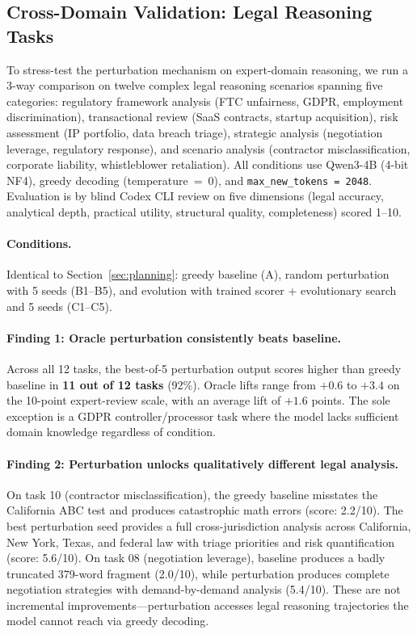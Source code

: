 \documentclass{article}
\begin{document}
\subsection{Cross-Domain Validation: Legal Reasoning Tasks}
\label{sec:legal}

To stress-test the perturbation mechanism on expert-domain reasoning, we
run a 3-way comparison on twelve complex legal reasoning scenarios spanning
five categories: regulatory framework analysis (FTC unfairness, GDPR, employment
discrimination), transactional review (SaaS contracts, startup acquisition),
risk assessment (IP portfolio, data breach triage), strategic analysis
(negotiation leverage, regulatory response), and scenario analysis (contractor
misclassification, corporate liability, whistleblower retaliation). All conditions
use Qwen3-4B (4-bit NF4), greedy decoding (temperature~=~0), and
\texttt{max\_new\_tokens~=~2048}. Evaluation is by blind Codex CLI review on
five dimensions (legal accuracy, analytical depth, practical utility, structural
quality, completeness) scored 1--10.

\paragraph{Conditions.} Identical to Section~\ref{sec:planning}: greedy
baseline (A), random perturbation with 5 seeds (B1--B5), and evolution
with trained scorer + evolutionary search and 5 seeds (C1--C5).

\paragraph{Finding 1: Oracle perturbation consistently beats baseline.}
Across all 12 tasks, the best-of-5 perturbation output
scores higher than greedy baseline in \textbf{11 out of 12 tasks} (92\%).
Oracle lifts range from $+0.6$ to $+3.4$ on the 10-point expert-review
scale, with an average lift of $+1.6$ points. The sole exception is a
GDPR controller/processor task where the model lacks sufficient domain
knowledge regardless of condition.

\paragraph{Finding 2: Perturbation unlocks qualitatively different legal analysis.}
On task 10 (contractor misclassification), the greedy baseline misstates
the California ABC test and produces catastrophic math errors (score:
2.2/10). The best perturbation seed provides a full cross-jurisdiction
analysis across California, New York, Texas, and federal law with
triage priorities and risk quantification (score: 5.6/10). On task 08
(negotiation leverage), baseline produces a badly truncated 379-word
fragment (2.0/10), while perturbation produces complete negotiation
strategies with demand-by-demand analysis (5.4/10). These are not
incremental improvements---perturbation accesses legal reasoning
trajectories the model cannot reach via greedy decoding.
\end{document}
